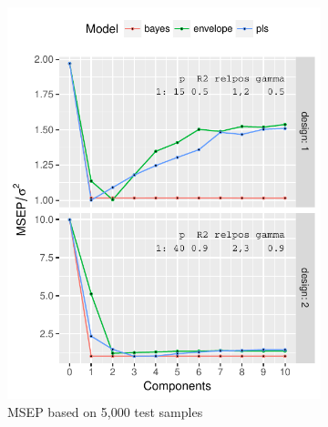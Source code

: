 \documentclass[a4paper, 11pt]{article}
\begin{document}
\begin{figure}[H]
  \label{fig:est_pred_plot}
  \begin{subfigure}[b]{0.5\textwidth}
    \includegraphics[width=\textwidth]{../pdf/msep-sigma-plot.pdf}
    \caption{MSEP based on 5,000 test samples}
    \label{fig:msep}
  \end{subfigure}
  \begin{subfigure}[b]{0.5\textwidth}

\end{subfigure}
\end{figure}
\end{document}
